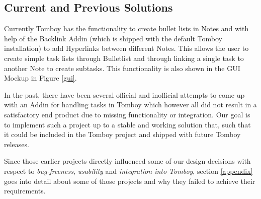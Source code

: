 \subsection{Current and Previous Solutions}
\label{description:solution}
Currently Tomboy has the functionality to create bullet lists in Notes and with help of the Backlink Addin (which is shipped with the default Tomboy installation) to add Hyperlinks between different Notes. This allows the user to create simple task lists through Bulletlist and through linking a single task to another Note to create subtasks. This functionality is also shown in the GUI Mockup in Figure \ref{gui}.

In the past, there have been several official and inofficial attempts to come up with an Addin for handling tasks in Tomboy which however all did not result in a satisfactory end product due to missing functionality or integration. Our goal is to implement such a project up to a stable and working solution that, such that it could be included in the Tomboy project and shipped with future Tomboy releases. 

\label{lessons}
Since those earlier projects directly influenced some of our design decisions with respect to \textit{bug-freeness}, \textit{usability} and \textit{integration into Tomboy}, section \ref{appendix} goes into detail about some of those projects and why they failed to achieve their requirements.

